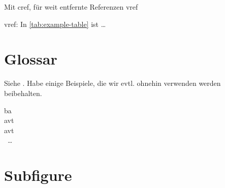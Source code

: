 Mit cref, für weit entfernte Referenzen vref

vref: In \vref{tab:example-table} ist \dots


\section{Glossar}
Siehe . Habe einige Beispiele, die wir evtl. ohnehin verwenden werden beibehalten.

\gls{ba} \\
\acs{avt}\\
\acf{avt} \\\
\dots

\section{Subfigure}

